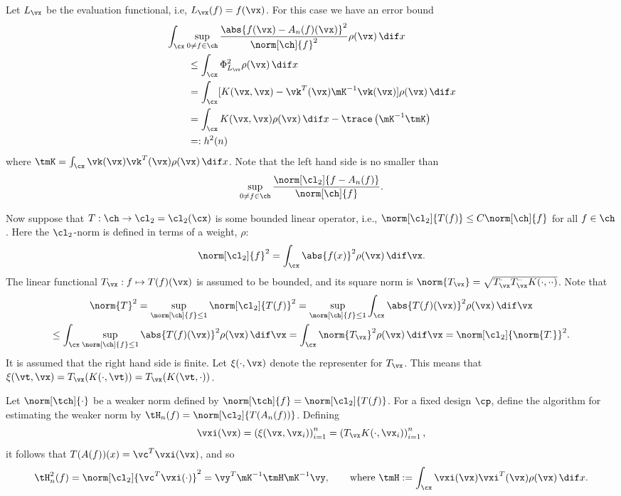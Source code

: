\documentclass[11pt]{amsart}
\theoremstyle{definition}
\begin{document}
Let $L_{\vx}$ be the evaluation functional, i.e, $L_{\vx}(f)=f(\vx)$.  For this case we have an error bound
\begin{align} \label{errexpress}
\MoveEqLeft{\int_{\cx} \sup_{0 \ne f \in \ch} \frac{\abs{f(\vx) - A_n(f)(\vx)}^2}{\norm[\ch]{f}^2} \rho(\vx) \, \dif x}\\
\nonumber
 &\le \int_{\cx} \Phi_{L_{\vx}}^2 \rho(\vx) \, \dif x \\
\nonumber
& = \int_{\cx} [K(\vx,\vx) - \vk^T(\vx)\mK^{-1} \vk(\vx) ] \rho(\vx) \, \dif x\\
\nonumber
& = \int_{\cx} K(\vx,\vx) \rho(\vx) \, \dif x - \trace\left( \mK^{-1} \tmK \right) \\
\nonumber
&=: h^2(n)
\end{align}
where $\tmK=\int_{\cx} \vk(\vx) \vk^T(\vx) \rho(\vx) \, \dif x$.
Note that the left hand side is no smaller than
\[
\sup_{0 \ne f \in \ch} \frac{\norm[\cl_2]{f-A_n(f)}}{\norm[\ch]{f}}.
\]

Now suppose that $T:\ch \to \cl_2=\cl_2(\cx)$ is some bounded linear operator, i.e., $\norm[\cl_2]{T(f)} \le C\norm[\ch]{f}$ for all $f \in \ch$.  Here the $\cl_2$-norm is defined in terms of a weight, $\rho$:
\[
\norm[\cl_2]{f}^2=\int_{\cx} \abs{f(x)}^2 \rho(\vx) \, \dif \vx.
\]
The linear functional $T_{\vx} : f \mapsto T(f)(\vx)$ is assumed to be bounded, and its square norm is $\norm{T_{\vx}}=\sqrt{T^{\cdot}_{\vx}T^{\cdot \cdot}_{\vx} K(\cdot,\cdot\cdot)}$. Note that
\begin{multline*}
\norm{T}^2 = \sup_{\norm[\ch]{f} \le 1} \norm[\cl_2]{T(f)}^2
= \sup_{\norm[\ch]{f} \le 1} \int_{\cx} \abs{T(f)(\vx)}^2 \rho(\vx) \, \dif \vx \\
\le \int_{\cx} \sup_{\norm[\ch]{f} \le 1}  \abs{T(f)(\vx)}^2  \rho(\vx) \, \dif \vx
= \int_{\cx} \norm{T_{\vx}}^2  \rho(\vx) \, \dif \vx =\norm[\cl_2]{\norm{T_{\cdot}}}^2.
\end{multline*}
It is assumed that the right hand side is finite.  Let $\xi(\cdot,\vx)$ denote the representer for $T_{\vx}$.  This means that $\xi(\vt,\vx)=T_{\vx}(K(\cdot,\vt))=T_{\vx}(K(\vt,\cdot))$.

Let $\norm[\tch]{\cdot}$ be a weaker norm defined by $\norm[\tch]{f} = \norm[\cl_2]{T(f)}$.  For a fixed design $\cp$, define the algorithm for estimating the weaker norm by $\tH_n(f)= \norm[\cl_2]{T(A_n(f))}$.  Defining
\[
\vxi(\vx)=\left(\xi(\vx,\vx_i) \right)_{i=1}^n=\left(T_{\vx}K(\cdot,\vx_i) \right)_{i=1}^n,
\]
it follows that $T(A(f))(x)=\vc^T\vxi(\vx)$, and so
\begin{equation*}
\tH_n^2(f) = \norm[\cl_2]{\vc^T\vxi(\cdot)}^2 = \vy^T \mK^{-1} \tmH \mK^{-1}\vy, \qquad \text{where }\tmH := \int_{\cx} \vxi(\vx) \vxi^T(\vx) \rho(\vx) \, \dif x.
\end{equation*}
\end{document}
